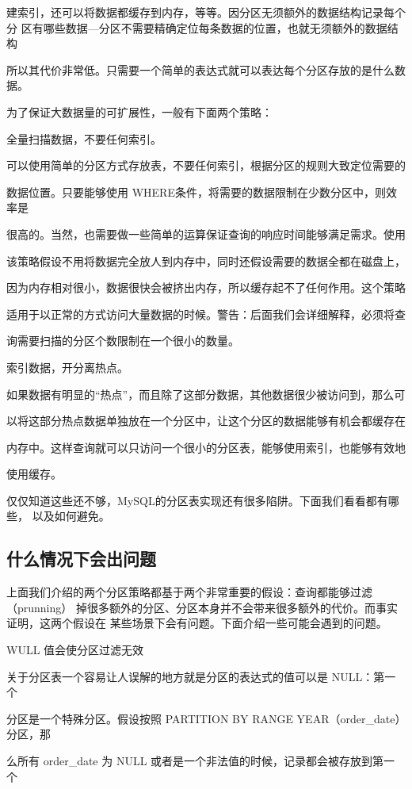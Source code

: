 建索引，还可以将数据都缓存到内存，等等。因分区无须额外的数据结构记录每个分
区有哪些数据—分区不需要精确定位每条数据的位置，也就无须额外的数据结构

所以其代价非常低。只需要一个简单的表达式就可以表达每个分区存放的是什么数据。

为了保证大数据量的可扩展性，一般有下面两个策略：

全量扫描数据，不要任何索引。

可以使用简单的分区方式存放表，不要任何索引，根据分区的规则大致定位需要的

数据位置。只要能够使用 WHERE条件，将需要的数据限制在少数分区中，则效率是

很高的。当然，也需要做一些简单的运算保证查询的响应时间能够满足需求。使用

该策略假设不用将数据完全放人到内存中，同时还假设需要的数据全都在磁盘上，

因为内存相对很小，数据很快会被挤出内存，所以缓存起不了任何作用。这个策略

适用于以正常的方式访问大量数据的时候。警告：后面我们会详细解释，必须将查

询需要扫描的分区个数限制在一个很小的数量。

索引数据，开分离热点。

如果数据有明显的“热点”，而且除了这部分数据，其他数据很少被访问到，那么可

以将这部分热点数据单独放在一个分区中，让这个分区的数据能够有机会都缓存在

内存中。这样查询就可以只访问一个很小的分区表，能够使用索引，也能够有效地

使用缓存。

仅仅知道这些还不够，MySQL的分区表实现还有很多陷阱。下面我们看看都有哪些，
以及如何避免。

\subsection{什么情况下会出问题}
上面我们介绍的两个分区策略都基于两个非常重要的假设：查询都能够过滤（prunning）
掉很多额外的分区、分区本身并不会带来很多额外的代价。而事实证明，这两个假设在
某些场景下会有问题。下面介绍一些可能会遇到的问题。

WULL 值会使分区过滤无效

关于分区表一个容易让人误解的地方就是分区的表达式的值可以是 NULL：第一个

分区是一个特殊分区。假设按照 PARTITION BY RANGE YEAR（order\_date）分区，那

么所有 order\_date 为 NULL 或者是一个非法值的时候，记录都会被存放到第一个


